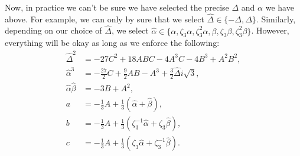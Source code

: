 Now, in practice we can't be sure we have selected the precise \(\Delta\) and \(\alpha\) we have above.
For example, we can only by sure that we select \(\hat\Delta \in \{-\Delta, \Delta\}\). Similarly, depending
on our choice of \(\hat \Delta\), we select \(\hat \alpha \in \{\alpha, \zeta_3\alpha, \zeta_3^2\alpha,
\beta, \zeta_3\beta, \zeta_3^2\beta\}\). However, everything will be okay as long as we enforce the
following:
\begin{align}
\hat\Delta^2 & = -27 C^2 + 18 ABC
    - 4 A^3C - 4 B^3 + A^2 B^2, \\
\hat\alpha^3 & = -\frac{27}{2} C + \frac{9}{2} AB - A^3
    + \frac{3}{2} \hat\Delta i\sqrt{3}, \\
\hat\alpha \hat\beta & = -3B + A^2, \\
a & = -\frac{1}{3} A + \frac{1}{3}(\hat\alpha + \hat\beta), \\
b & = -\frac{1}{3} A + \frac{1}{3}(\zeta_3^{-1} \hat\alpha + \zeta_3 \hat\beta), \\
c & = -\frac{1}{3} A + \frac{1}{3}(\zeta_3 \hat\alpha + \zeta_3^{-1} \hat\beta). 
\end{align}
